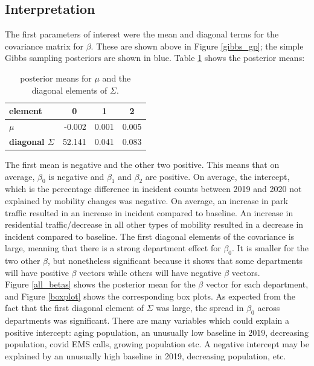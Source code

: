 \documentclass[paper=a4, fontsize=11pt]{scrartcl}
\begin{document}
\newpage
\subsection{Interpretation}
The first parameters of interest were the mean and diagonal terms for the covariance matrix for $\beta$. These are shown above in Figure \ref{gibbs_gp}; the simple Gibbs sampling posteriors are shown in blue. Table \ref{tab2} shows the posterior means:\\


\begin{table}[!htb]
\centering
\begin{tabular}{|l|r|r|r|}
\hline
\textbf{element}           & \multicolumn{1}{c|}{\textbf{0}} & \multicolumn{1}{c|}{\textbf{1}} & \multicolumn{1}{c|}{\textbf{2}} \\ \hline
\textbf{$\mu$}             & -0.002                          & 0.001                           & 0.005                           \\ \hline
\textbf{diagonal $\Sigma$} & 52.141                          & 0.041                           & 0.083                           \\ \hline

\end{tabular}
\caption{posterior means for $\mu$ and the diagonal elements of $\Sigma$.}
\label{tab2}
\end{table}

The first mean is negative and the other two positive. This means that on average, $\beta_0$ is negative and $\beta_1$  and $\beta_2$ are positive. On average, the intercept, which is the percentage difference in incident counts between 2019 and 2020 not explained by mobility changes was negative. On average, an increase in park traffic resulted in an increase in incident compared to baseline. An increase in residential traffic/decrease in all other types of mobility resulted in a decrease in incident compared to baseline.  The first diagonal elements of the covariance is large, meaning that there is a strong department effect for $\beta_0$. It is smaller for the two other $\beta$, but nonetheless significant because it shows that some departments will have positive $\beta$ vectors while others will have negative $\beta$ vectors.\\

Figure \ref{all_betas} shows the posterior mean for the $\beta$ vector for each department, and Figure \ref{boxplot} shows the corresponding box plots. As expected from the fact that the first diagonal element of $\Sigma$ was large, the spread in $\beta_0$ across departments was significant. There are many variables which could explain a positive intercept: aging population, an unusually low baseline in 2019, decreasing population, covid EMS calls, growing population etc. A negative intercept may be explained by an unusually high baseline in 2019, decreasing population, etc. \\
\end{document}
